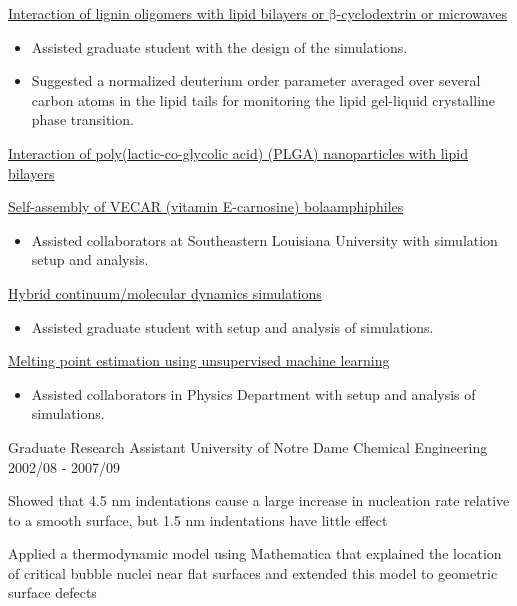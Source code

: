 \begin{cventries}
{\begin{cvitems}
\begin{itemize}
            \end{itemize}
        \item {\underline{Interaction of lignin oligomers with lipid bilayers or $\mathrm{\beta}$-cyclodextrin or microwaves}}
            \begin{itemize}
            \item {Assisted graduate student with the design of the simulations.}
            \item {Suggested a normalized deuterium order parameter averaged over several carbon atoms in the lipid tails for monitoring the lipid gel-liquid crystalline phase transition.}
            \end{itemize}            
        \item {\underline{Interaction of poly(lactic-co-glycolic acid) (PLGA) nanoparticles with lipid bilayers}}
        \item {\underline{Self-assembly of VECAR (vitamin E-carnosine) bolaamphiphiles}}
            \begin{itemize}
            \item {Assisted collaborators at Southeastern Louisiana University with simulation setup and analysis.}
            \end{itemize}
        \item {\underline{Hybrid continuum/molecular dynamics simulations}}
            \begin{itemize}
            \item {Assisted graduate student with setup and analysis of simulations.}
            \end{itemize}
        \item {\underline{Melting point estimation using unsupervised machine learning}}
            \begin{itemize}
            \item {Assisted collaborators in Physics Department with setup and analysis of simulations.}
            \end{itemize}      \end{cvitems}
    }
    
  \cventry
    {Graduate Research Assistant} %
    {University of Notre Dame} %
    {Chemical Engineering} %
    {2002/08 - 2007/09} %
    {
      \begin{cvitems} %
        \item {Showed that 4.5 nm indentations cause a large increase in nucleation rate relative to a smooth surface, but 1.5 nm indentations have little effect
        \item {Applied a thermodynamic model using Mathematica that explained the location of critical bubble nuclei near flat surfaces and extended this model to geometric surface defects}
}
      \end{cvitems}
    }
    

\end{cventries}
